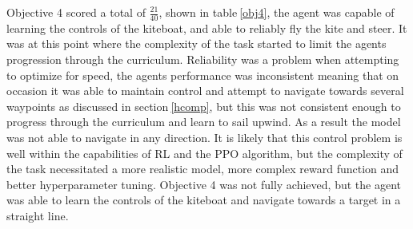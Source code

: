 \begin{table}[!htb]
    \centering
    \caption{Objective 4 Evaluation}\label{obj4}
\end{table}
Objective 4 scored a total of $\frac{21}{40}$, shown in table$~$\ref{obj4}, the agent was capable of learning the controls of the kiteboat, and able to reliably fly the kite and steer. It was at this point where the complexity of the task started to limit the agents progression through the curriculum. Reliability was a problem when attempting to optimize for speed, the agents performance was inconsistent meaning that on occasion it was able to maintain control and attempt to navigate towards several waypoints as discussed in section$~$\ref{hcomp}, but this was not consistent enough to progress through the curriculum and learn to sail upwind. As a result the model was not able to navigate in any direction. It is likely that this control problem is well within the capabilities of RL and the PPO algorithm, but the complexity of the task necessitated a more realistic model, more complex reward function and better hyperparameter tuning. Objective 4 was not fully achieved, but the agent was able to learn the controls of the kiteboat and navigate towards a target in a straight line.  


